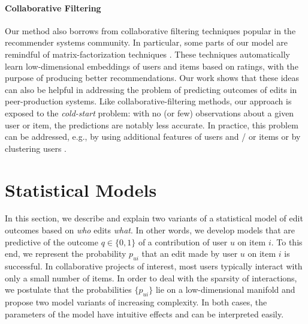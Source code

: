 \documentclass[format=sigconf]{acmart}
\begin{document}
\paragraph{Collaborative Filtering}
Our method also borrows from collaborative filtering techniques popular in the recommender systems community.
In particular, some parts of our model are remindful of matrix-factorization techniques \citep{koren2009matrix}.
These techniques automatically learn low-dimensional embeddings of users and items based on ratings, with the purpose of producing better recommendations.
Our work shows that these ideas can also be helpful in addressing the problem of predicting outcomes of edits in peer-production systems.
Like collaborative-filtering methods, our approach is exposed to the \emph{cold-start} problem:
with no (or few) observations about a given user or item, the predictions are notably less accurate.
In practice, this problem can be addressed, e.g., by using additional features of users and / or items \citep{schein2002methods, lam2008addressing} or by clustering users \citep{levi2012finding}.
\section{Statistical Models}
\label{sec:models}

In this section, we describe and explain two variants of a statistical model of edit outcomes based on \emph{who} edits \emph{what}.
In other words, we develop models that are predictive of the outcome $q \in \{0, 1\}$ of a contribution of user $u$ on item $i$.
To this end, we represent the probability $p_{ui}$ that an edit made by user $u$ on item $i$ is successful.
In collaborative projects of interest, most users typically interact with only a small number of items.
In order to deal with the sparsity of interactions, we postulate that the probabilities $\{ p_{ui} \}$ lie on a low-dimensional manifold and propose two model variants of increasing complexity.
In both cases, the parameters of the model have intuitive effects and can be interpreted easily.
\end{document}
